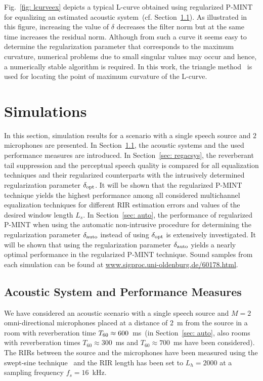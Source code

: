 \documentclass[draftcls,onecolumn,11pt]{IEEEtran}
\begin{document}
Fig.~\ref{fig: lcurveex} depicts a typical L-curve obtained using regularized P-MINT for equalizing an estimated acoustic system~(cf. Section~\ref{sec: acsys}).
As illustrated in this figure, increasing the value of $\delta$ decreases the filter norm but at the same time increases the residual norm.
Although from such a curve it seems easy to determine the regularization parameter that corresponds to the maximum curvature, numerical problems due to small singular values may occur and hence, a numerically stable algorithm is required.
In this work, the triangle method~\cite{Castellanos_2002} is used for locating the point of maximum curvature of the L-curve.

\section{Simulations}
\label{sec: exp}

In this section, simulation results for a scenario with a single speech source and $2$ microphones are presented.
In Section~\ref{sec: acsys}, the acoustic systems and the used performance measures are introduced.
In Section~\ref{sec: regacsys}, the reverberant tail suppression and the perceptual speech quality is compared for all equalization techniques and their regularized counterparts with the intrusively determined regularization parameter $\delta_{\rm opt}$.
It will be shown that the regularized P-MINT technique yields the highest performance among all considered multichannel equalization techniques for different RIR estimation errors and values of the desired window length $L_s$.
In Section~\ref{sec: auto}, the performance of regularized P-MINT when using the automatic non-intrusive procedure for determining the regularization parameter $\delta_{\rm auto}$ instead of using $\delta_{\rm opt}$ is extensively investigated.
It will be shown that using the regularization parameter $\delta_{\rm auto}$ yields a nearly optimal performance in the regularized P-MINT technique.
Sound samples from each simulation can be found at {\small \url{www.sigproc.uni-oldenburg.de/60178.html}}.

\subsection{Acoustic System and Performance Measures}
\label{sec: acsys}

We have considered an acoustic scenario with a single speech source and $M=2$ omni-directional microphones placed at a distance of $2$~m from the source in a room with reverberation time $T_{\rm 60} \approx 600$~ms~(in Section~\ref{sec: auto}, also rooms with reverberation times $T_{60} \approx 300$~ms and $T_{60} \approx 700$~ms have been considered).
The RIRs between the source and the microphones have been measured using the swept-sine technique~\cite{Farina_2000} and the RIR length has been set to $L_h = 2000$ at a sampling frequency $f_s = 16$~kHz.
\end{document}

